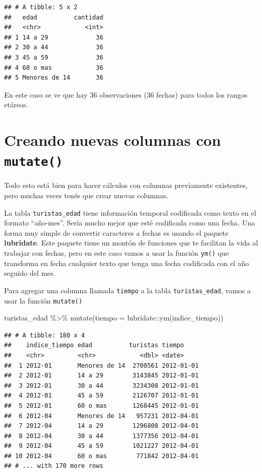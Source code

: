 \documentclass[
  openany]{book}
\newenvironment{Shaded}{\begin{snugshade}}{\end{snugshade}}
\newcommand{\AttributeTok}[1]{\textcolor[rgb]{0.77,0.63,0.00}{#1}}
\newcommand{\FunctionTok}[1]{\textcolor[rgb]{0.00,0.00,0.00}{#1}}
\newcommand{\NormalTok}[1]{#1}
\newcommand{\SpecialCharTok}[1]{\textcolor[rgb]{0.00,0.00,0.00}{#1}}
\begin{document}
\begin{verbatim}
## # A tibble: 5 x 2
##   edad          cantidad
##   <chr>            <int>
## 1 14 a 29             36
## 2 30 a 44             36
## 3 45 a 59             36
## 4 60 o mas            36
## 5 Menores de 14       36
\end{verbatim}

En este caso se ve que hay 36 observaciones (36 fechas) para todos los rangos etáreos.

\hypertarget{creando-nuevas-columnas-con-mutate}{%
\section{\texorpdfstring{Creando nuevas columnas con \texttt{mutate()}}{Creando nuevas columnas con mutate()}}\label{creando-nuevas-columnas-con-mutate}}

Todo esto está bien para hacer cálculos con columnas previamente existentes, pero muchas veces tenés que crear nuevas columnas.

La tabla \texttt{turistas\_edad} tiene información temporal codificada como texto en el formato ``año-mes''.
Sería mucho mejor que esté codificada como una fecha.
Una forma muy simple de convertir caracteres a fechas es usando el paquete \textbf{lubridate}.
Este paquete tiene un montón de funciones que te facilitan la vida al trabajar con fechas, pero en este caso vamos a usar la función \texttt{ym()} que transforma en fecha cualquier texto que tenga una fecha codificada con el año seguido del mes.

Para agregar una columna llamada \texttt{tiempo} a la tabla \texttt{turistas\_edad}, vamos a usar la función \texttt{mutate()}

\begin{Shaded}
\begin{Highlighting}[]
\NormalTok{turistas\_edad }\SpecialCharTok{\%\textgreater{}\%} 
  \FunctionTok{mutate}\NormalTok{(}\AttributeTok{tiempo =}\NormalTok{ lubridate}\SpecialCharTok{::}\FunctionTok{ym}\NormalTok{(indice\_tiempo))}
\end{Highlighting}
\end{Shaded}

\begin{verbatim}
## # A tibble: 180 x 4
##    indice_tiempo edad          turistas tiempo    
##    <chr>         <chr>            <dbl> <date>    
##  1 2012-01       Menores de 14  2700561 2012-01-01
##  2 2012-01       14 a 29        3143845 2012-01-01
##  3 2012-01       30 a 44        3234308 2012-01-01
##  4 2012-01       45 a 59        2126707 2012-01-01
##  5 2012-01       60 o mas       1268445 2012-01-01
##  6 2012-04       Menores de 14   957231 2012-04-01
##  7 2012-04       14 a 29        1296808 2012-04-01
##  8 2012-04       30 a 44        1377356 2012-04-01
##  9 2012-04       45 a 59        1021227 2012-04-01
## 10 2012-04       60 o mas        771842 2012-04-01
## # ... with 170 more rows
\end{verbatim}
\end{document}

